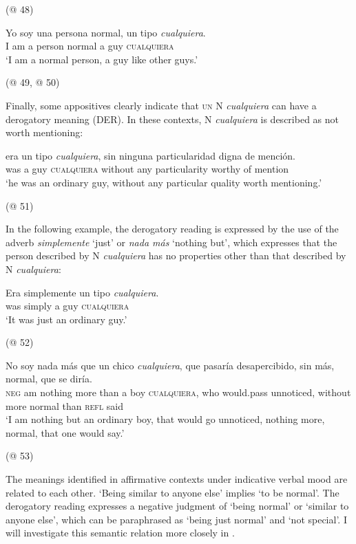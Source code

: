   (@ 48)
\z


\ea \label{bkm:Ref63545479} %
\gll Yo soy una persona normal, un tipo \textit{cualquiera}.\\
I am a person normal a guy \textsc{cualquiera}\\
\glt ‘I am a normal person, a guy like other guys.’

  (@ 49, @ 50)
\z

Finally, some appositives clearly indicate that \textsc{un} N \textit{cualquiera} can have a derogatory meaning (DER). In these contexts, N \textit{cualquiera} is described as not worth mentioning:

\ea \label{ex:key:134} %
\gll era un tipo \textit{cualquiera}, sin ninguna particularidad digna de mención.\\
was a guy \textsc{cualquiera} without any particularity worthy of mention\\
\glt ‘he was an ordinary guy, without any particular quality worth mentioning.’

  (@ 51)
\z

In the following example, the derogatory reading is expressed by the use of the adverb \textit{simplemente} ‘just’ or \textit{nada más} ‘nothing but’, which expresses that the person described by N \textit{cualquiera} has no properties other than that described by N \textit{cualquiera}:

\ea \label{ex:key:135} %
\gll Era simplemente un tipo \textit{cualquiera}.\\
was simply a guy \textsc{cualquiera}\\
\glt ‘It was just an ordinary guy.’

  (@ 52)
\z

\ea \label{ex:key:136} %
\gll No soy nada más que un chico \textit{cualquiera}, que pasaría desapercibido, sin más, normal, que se diría.\\
\textsc{neg} am nothing more than a boy \textsc{cualquiera}, who would.pass unnoticed, without more normal than \textsc{refl} said\\
\glt ‘I am nothing but an ordinary boy, that would go unnoticed, nothing more, normal, that one would say.’

  (@ 53)
\z

The meanings identified in affirmative contexts under indicative verbal mood are related to each other. ‘Being similar to anyone else’ implies ‘to be normal’. The derogatory reading expresses a negative judgment of ‘being normal’ or ‘similar to anyone else’, which can be paraphrased as ‘being just normal’ and ‘not special’. I will investigate this semantic relation more closely in .


